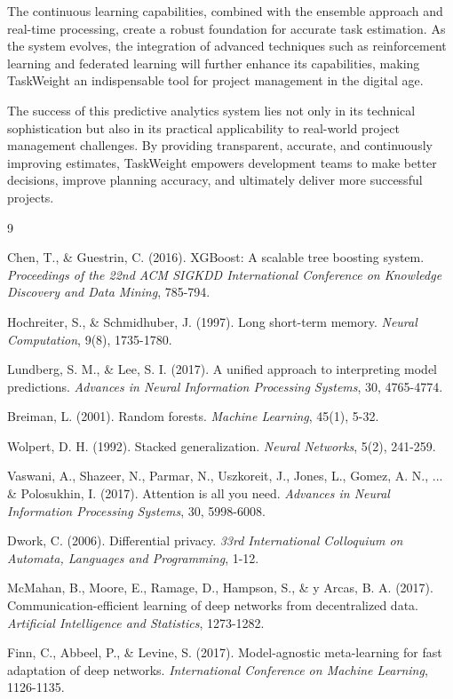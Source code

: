 \documentclass[12pt,a4paper]{article}
\begin{document}
The continuous learning capabilities, combined with the ensemble approach and real-time processing, create a robust foundation for accurate task estimation. As the system evolves, the integration of advanced techniques such as reinforcement learning and federated learning will further enhance its capabilities, making TaskWeight an indispensable tool for project management in the digital age.

The success of this predictive analytics system lies not only in its technical sophistication but also in its practical applicability to real-world project management challenges. By providing transparent, accurate, and continuously improving estimates, TaskWeight empowers development teams to make better decisions, improve planning accuracy, and ultimately deliver more successful projects.


\begin{thebibliography}{9}

Chen, T., \& Guestrin, C. (2016). XGBoost: A scalable tree boosting system. \emph{Proceedings of the 22nd ACM SIGKDD International Conference on Knowledge Discovery and Data Mining}, 785-794.

Hochreiter, S., \& Schmidhuber, J. (1997). Long short-term memory. \emph{Neural Computation}, 9(8), 1735-1780.

Lundberg, S. M., \& Lee, S. I. (2017). A unified approach to interpreting model predictions. \emph{Advances in Neural Information Processing Systems}, 30, 4765-4774.

Breiman, L. (2001). Random forests. \emph{Machine Learning}, 45(1), 5-32.

Wolpert, D. H. (1992). Stacked generalization. \emph{Neural Networks}, 5(2), 241-259.

Vaswani, A., Shazeer, N., Parmar, N., Uszkoreit, J., Jones, L., Gomez, A. N., ... \& Polosukhin, I. (2017). Attention is all you need. \emph{Advances in Neural Information Processing Systems}, 30, 5998-6008.

Dwork, C. (2006). Differential privacy. \emph{33rd International Colloquium on Automata, Languages and Programming}, 1-12.

McMahan, B., Moore, E., Ramage, D., Hampson, S., \& y Arcas, B. A. (2017). Communication-efficient learning of deep networks from decentralized data. \emph{Artificial Intelligence and Statistics}, 1273-1282.

Finn, C., Abbeel, P., \& Levine, S. (2017). Model-agnostic meta-learning for fast adaptation of deep networks. \emph{International Conference on Machine Learning}, 1126-1135.

\end{thebibliography}
\end{document}
